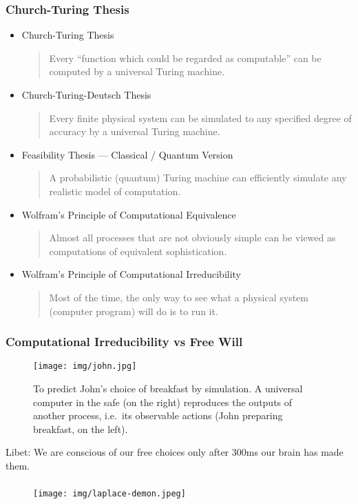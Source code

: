 \documentclass[UTF8,11pt,colorlinks,compress,openany]{beamer}%
\begin{document}
\begin{frame}\frametitle{Church-Turing Thesis}
\begin{itemize}
	\item Church-Turing Thesis
\begin{quote}
	Every ``function which could be regarded as computable'' can be computed by a universal Turing machine.
\end{quote}
	\item Church-Turing-Deutsch Thesis
\begin{quote}
 	Every finite physical system can be simulated to any specified degree of accuracy by a universal Turing machine.
\end{quote}
\item Feasibility Thesis --- Classical / Quantum Version
\begin{quote}
 A probabilistic (quantum) Turing machine can efficiently simulate any realistic model of computation.
\end{quote}
\item Wolfram's Principle of Computational Equivalence
\begin{quote}
 	Almost all processes that are not obviously simple can be viewed as computations of equivalent sophistication.
\end{quote}
\item Wolfram's Principle of Computational Irreducibility
\begin{quote}
	Most of the time, the only way to see what a physical system (computer program) will do is to run it.
\end{quote}
\end{itemize}
\end{frame}

\begin{frame}\frametitle{Computational Irreducibility vs Free Will}
\begin{figure}[hbt]
\begin{center}
\texttt{[image: img/john.jpg]}
\caption{To predict John's choice of breakfast by simulation. A universal computer in the safe (on the right) reproduces the outputs of another process, i.e.\ its observable actions (John preparing breakfast, on the left).}
\end{center}
\end{figure}
Libet: We are conscious of our free choices only after $300$ms our brain has made them.
\end{frame}

\begin{frame}\frametitle{}
\begin{figure}[H]
\texttt{[image: img/laplace-demon.jpeg]}
\end{figure}
\end{frame}
\end{document}
